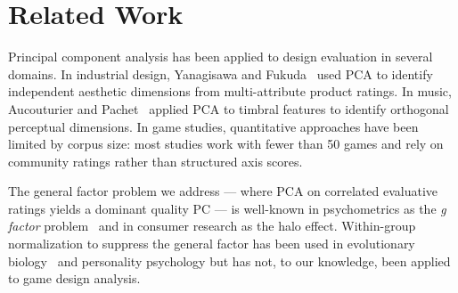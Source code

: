 \section{Related Work}
\label{sec:related}

Principal component analysis has been applied to design evaluation in several domains.
In industrial design, Yanagisawa and Fukuda~\cite{yanagisawa2005study} used PCA to
identify independent aesthetic dimensions from multi-attribute product ratings.
In music, Aucouturier and Pachet~\cite{aucouturier2003music} applied PCA to timbral
features to identify orthogonal perceptual dimensions. In game studies, quantitative
approaches have been limited by corpus size: most studies work with fewer than 50 games
and rely on community ratings rather than structured axis scores.

The general factor problem we address --- where PCA on correlated evaluative ratings
yields a dominant quality PC --- is well-known in psychometrics as the \emph{g factor}
problem~\cite{spearman1904general} and in consumer research as the halo effect.
Within-group normalization to suppress the general factor has been used in
evolutionary biology~\cite{bookstein1991morphometric} and personality psychology
but has not, to our knowledge, been applied to game design analysis.
